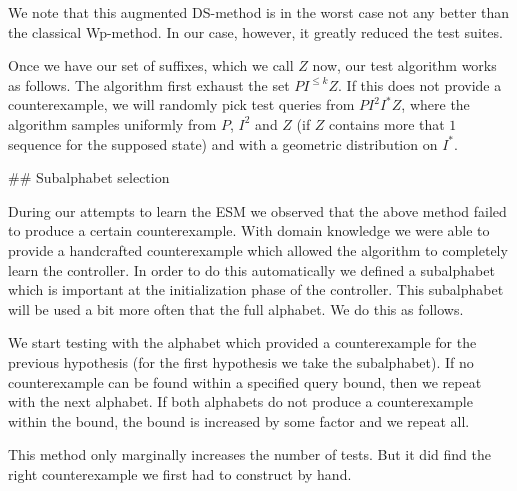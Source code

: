 We note that this augmented DS-method is in the worst case not any better than
the classical Wp-method. In our case, however, it greatly reduced the test
suites.

Once we have our set of suffixes, which we call $Z$ now, our test algorithm
works as follows. The algorithm first exhaust the set $P I^{\leq k} Z$. If this
does not provide a counterexample, we will randomly pick test queries from $P
I^2 I^\ast Z$, where the algorithm samples uniformly from $P$, $I^2$ and $Z$ (if
$Z$ contains more that $1$ sequence for the supposed state) and with a geometric
distribution on $I^\ast$.


## Subalphabet selection

During our attempts to learn the ESM we observed that the above method failed to
produce a certain counterexample. With domain knowledge we were able to provide
a handcrafted counterexample which allowed the algorithm to completely learn the
controller. In order to do this automatically we defined a subalphabet which is
important at the initialization phase of the controller. This subalphabet will
be used a bit more often that the full alphabet. We do this as follows.

We start testing with the alphabet which provided a counterexample for the
previous hypothesis (for the first hypothesis we take the subalphabet). If no
counterexample can be found within a specified query bound, then we repeat with
the next alphabet. If both alphabets do not produce a counterexample within the
bound, the bound is increased by some factor and we repeat all.

This method only marginally increases the number of tests. But it did find the
right counterexample we first had to construct by hand.
